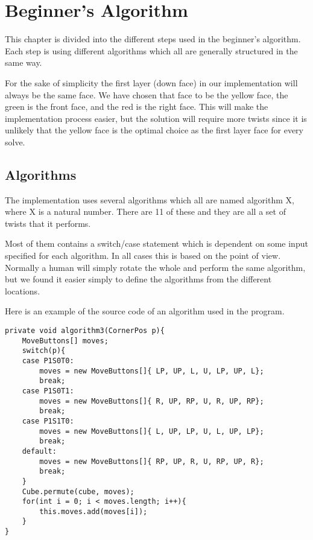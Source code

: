 \chapter{Beginner's Algorithm}
This chapter is divided into the different steps used in the beginner's algorithm.
Each step is using different algorithms which all are generally structured in the same way. 

For the sake of simplicity the first layer (down face) in our implementation will always be the same face. We have chosen that face to be the yellow face, the green is the front face, and the red is the right face. This will make the implementation process easier, but the solution will require more twists since it is unlikely that the yellow face is the optimal choice as the first layer face for every solve.

\section{Algorithms}
The implementation uses several algorithms which all are named algorithm X, where X is a natural number. There are 11 of these and they are all a set of twists that it performs. 

Most of them contains a switch/case statement which is dependent on some input specified for each algorithm. In all cases this is based on the point of view. Normally a human will simply rotate the whole \cube{} and perform the same algorithm, but we found it easier simply to define the algorithms from the different locations.

Here is an example of the source code of an algorithm used in the program.

\begin{lstlisting}[style=sourceCode, caption=\myCaption{This is algorithm 3, which will orientate the corners correctly. The for-loop is only for adding the moves to the console.}, label=src:beginners, float=htb]
private void algorithm3(CornerPos p){
	MoveButtons[] moves;
	switch(p){
	case P1S0T0:
		moves = new MoveButtons[]{ LP, UP, L, U, LP, UP, L};
		break;
	case P1S0T1:
		moves = new MoveButtons[]{ R, UP, RP, U, R, UP, RP};
		break;
	case P1S1T0:
		moves = new MoveButtons[]{ L, UP, LP, U, L, UP, LP};
		break;
	default:
		moves = new MoveButtons[]{ RP, UP, R, U, RP, UP, R};
		break;
	}
	Cube.permute(cube, moves);
	for(int i = 0; i < moves.length; i++){
		this.moves.add(moves[i]);
	}
}
\end{lstlisting}

